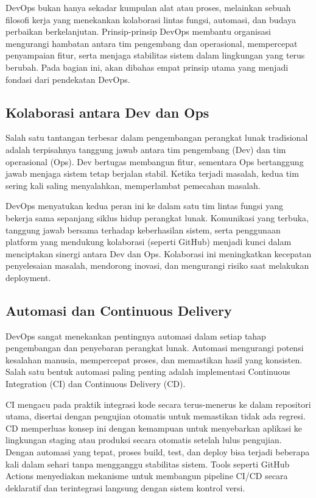 DevOps bukan hanya sekadar kumpulan alat atau proses, melainkan sebuah filosofi kerja yang menekankan kolaborasi lintas fungsi, automasi, dan budaya perbaikan berkelanjutan. Prinsip-prinsip DevOps membantu organisasi mengurangi hambatan antara tim pengembang dan operasional, mempercepat penyampaian fitur, serta menjaga stabilitas sistem dalam lingkungan yang terus berubah. Pada bagian ini, akan dibahas empat prinsip utama yang menjadi fondasi dari pendekatan DevOps.

\subsection{Kolaborasi antara Dev dan Ops}

Salah satu tantangan terbesar dalam pengembangan perangkat lunak tradisional adalah terpisahnya tanggung jawab antara tim pengembang (Dev) dan tim operasional (Ops). Dev bertugas membangun fitur, sementara Ops bertanggung jawab menjaga sistem tetap berjalan stabil. Ketika terjadi masalah, kedua tim sering kali saling menyalahkan, memperlambat pemecahan masalah.

DevOps menyatukan kedua peran ini ke dalam satu tim lintas fungsi yang bekerja sama sepanjang siklus hidup perangkat lunak. Komunikasi yang terbuka, tanggung jawab bersama terhadap keberhasilan sistem, serta penggunaan platform yang mendukung kolaborasi (seperti GitHub) menjadi kunci dalam menciptakan sinergi antara Dev dan Ops. Kolaborasi ini meningkatkan kecepatan penyelesaian masalah, mendorong inovasi, dan mengurangi risiko saat melakukan deployment.

\subsection{Automasi dan Continuous Delivery}

DevOps sangat menekankan pentingnya automasi dalam setiap tahap pengembangan dan penyebaran perangkat lunak. Automasi mengurangi potensi kesalahan manusia, mempercepat proses, dan memastikan hasil yang konsisten. Salah satu bentuk automasi paling penting adalah implementasi Continuous Integration (CI) dan Continuous Delivery (CD).

CI mengacu pada praktik integrasi kode secara terus-menerus ke dalam repositori utama, disertai dengan pengujian otomatis untuk memastikan tidak ada regresi. CD memperluas konsep ini dengan kemampuan untuk menyebarkan aplikasi ke lingkungan staging atau produksi secara otomatis setelah lulus pengujian. Dengan automasi yang tepat, proses build, test, dan deploy bisa terjadi beberapa kali dalam sehari tanpa mengganggu stabilitas sistem. Tools seperti GitHub Actions menyediakan mekanisme untuk membangun pipeline CI/CD secara deklaratif dan terintegrasi langsung dengan sistem kontrol versi.

